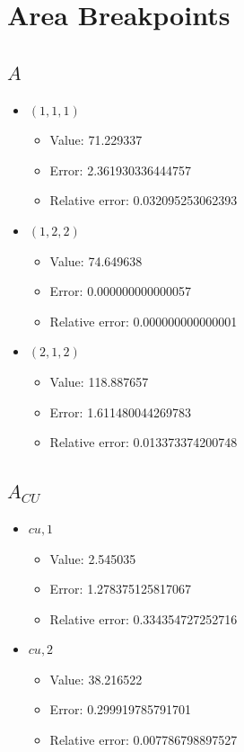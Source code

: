 \documentclass{article}%
\begin{document}
\section{Area Breakpoints}%
\thispagestyle{plain}%
\subsection{$A$}%
\begin{itemize}%
	\item $(1, 1, 1)$%
	\begin{itemize}%
		\item Value: 71.229337%
		\item Error: 2.361930336444757%
		\item Relative error: 0.032095253062393%
	\end{itemize}%
	\item $(1, 2, 2)$%
	\begin{itemize}%
		\item Value: 74.649638%
		\item Error: 0.000000000000057%
		\item Relative error: 0.000000000000001%
	\end{itemize}%
	\item $(2, 1, 2)$%
	\begin{itemize}%
		\item Value: 118.887657%
		\item Error: 1.611480044269783%
		\item Relative error: 0.013373374200748%
	\end{itemize}%
\end{itemize}%
\subsection{$A_{CU}$}%
\begin{itemize}%
	\item $\textit{cu},1$%
	\begin{itemize}%
		\item Value: 2.545035%
		\item Error: 1.278375125817067%
		\item Relative error: 0.334354727252716%
	\end{itemize}%
	\item $\textit{cu},2$%
	\begin{itemize}%
		\item Value: 38.216522%
		\item Error: 0.299919785791701%
		\item Relative error: 0.007786798897527%
	\end{itemize}%
\end{itemize}%
\end{document}
